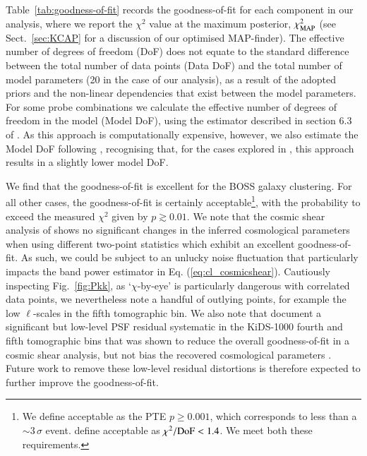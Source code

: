 Table~\ref{tab:goodness-of-fit} records the goodness-of-fit for each component in our \tttp analysis, where we report the $\chi^2$ value at the maximum posterior, $\chi^2_{\rm MAP}$ (see Sect.~\ref{sec:KCAP} for a discussion of our optimised MAP-finder).  
The effective number of degrees of freedom (DoF) does not equate to the standard difference between the total number of data points (Data DoF) and the total number of model parameters (20 in the case of our \tttp analysis), as a result of the adopted priors and the non-linear dependencies that exist between the model parameters.   For some probe combinations we calculate the effective number of degrees of freedom in the model (Model DoF), using the estimator described in section 6.3 of \citet{joachimi/etal:inprep}.    
As this approach is computationally expensive, however, we also estimate the Model DoF following \citet{Raveri2019}, recognising that, for the cases explored in \citet{joachimi/etal:inprep}, this approach results in a slightly lower model DoF.

We find that the goodness-of-fit is excellent for the BOSS galaxy clustering.  For all other cases, the goodness-of-fit is certainly acceptable\footnote{We define acceptable as the PTE $p \geq 0.001$, which corresponds to less than a $\sim\!3\,\sigma$ event.   \citet{abbott/etal:2018} define acceptable as $\chi^2/{\rm DoF} < 1.4$.  We meet both these requirements.}, with the probability to exceed the measured $\chi^2$ given by $p \gtrsim 0.01$.
We note that the cosmic shear analysis of \citet{asgari/etal:inprep} shows no significant changes in the inferred cosmological parameters when using different two-point statistics which exhibit an excellent goodness-of-fit.    As such, we could be subject to an unlucky noise fluctuation that particularly impacts the band power estimator in Eq. (\ref{eq:cl_cosmicshear}).  Cautiously inspecting Fig.~\ref{fig:Pkk}, as `$\chi$-by-eye' is particularly dangerous with correlated data points, we nevertheless note a handful of outlying points, for example the low $\ell$-scales in the fifth tomographic bin.   We also note that \citet{giblin/etal:inprep} document a significant but low-level PSF residual systematic in the KiDS-1000 fourth and fifth tomographic bins that was shown to reduce the overall goodness-of-fit in a cosmic shear analysis, but not bias the recovered cosmological parameters \citep[see the discussion in][]{amara/refregier:2008}.  Future work to remove these low-level residual distortions is therefore expected to further improve the goodness-of-fit.

